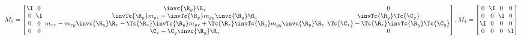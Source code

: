 \begin{algorithm}[ht]
    \begin{equation}
        \setlength\arraycolsep{2pt}
        M_3 =
        \begin{bmatrix}
            \I & 0 & \invc{\R_y} \R_x & 0 \\
            0 & \I & \invTc{\R_y} m_{yx} - \invTc{\R_y} m_{yy} \invc{\R_y} \R_x & \invTc{\R_y} \Tc{\C_y} \\
            0 & 0 & 
            m_{xx} - m_{xy} \invc{\R_y} \R_x - \Tc{\R_x} \invTc{\R_y} m_{yx} + \Tc{\R_x} \invTc{\R_y} m_{yy} \invc{\R_y} \R_x
            & \Tc{\C_x} - \Tc{\R_x} \invTc{\R_y} \Tc{\C_y} \\
            0 & 0 & \C_x - \C_y \invc{\R_y} \R_x & 0 \\
        \end{bmatrix}
        ,
        M_4 =
        \begin{bmatrix}
            0 & \I & 0 & 0 \\
            0 & 0 & \I & 0 \\
            \I & 0 & 0 & 0 \\
            0 & 0 & 0 & \I \\
        \end{bmatrix}
        \nonumber
    \end{equation}


\end{algorithm}
